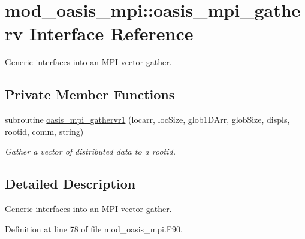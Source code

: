 \hypertarget{interfacemod__oasis__mpi_1_1oasis__mpi__gatherv}{\section{mod\+\_\+oasis\+\_\+mpi\+:\+:oasis\+\_\+mpi\+\_\+gatherv Interface Reference}
\label{interfacemod__oasis__mpi_1_1oasis__mpi__gatherv}
}


Generic interfaces into an M\+P\+I vector gather.  


\subsection*{Private Member Functions}
\begin{DoxyCompactItemize}
\item 
subroutine \hyperlink{interfacemod__oasis__mpi_1_1oasis__mpi__gatherv_a8d17b5a337d8ebec5160dfb891c6a715}{oasis\+\_\+mpi\+\_\+gathervr1} (locarr, loc\+Size, glob1\+D\+Arr, glob\+Size, displs, rootid, comm, string)
\begin{DoxyCompactList}\small\item\em Gather a vector of distributed data to a rootid. \end{DoxyCompactList}\end{DoxyCompactItemize}


\subsection{Detailed Description}
Generic interfaces into an M\+P\+I vector gather. 

Definition at line 78 of file mod\+\_\+oasis\+\_\+mpi.\+F90.




